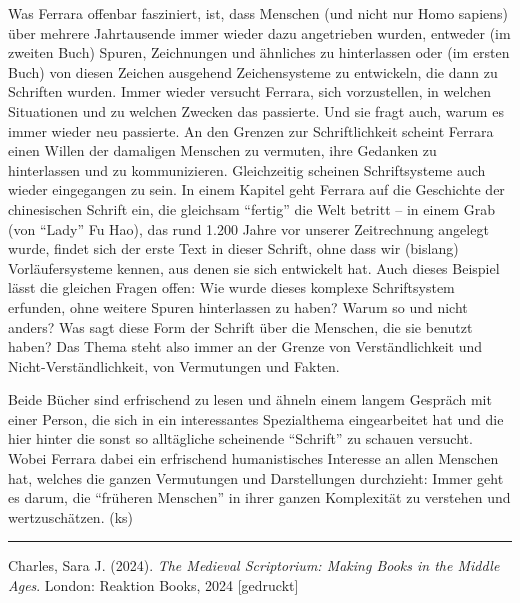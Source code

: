 \documentclass[a4paper,
fontsize=11pt,
oneside,
numbers=noperiodatend,
parskip=half-,
bibliography=totoc,
final
]{scrartcl}
\begin{document}
Was Ferrara offenbar fasziniert, ist, dass Menschen (und nicht nur Homo
sapiens) über mehrere Jahrtausende immer wieder dazu angetrieben wurden,
entweder (im zweiten Buch) Spuren, Zeichnungen und ähnliches zu
hinterlassen oder (im ersten Buch) von diesen Zeichen ausgehend
Zeichensysteme zu entwickeln, die dann zu Schriften wurden. Immer wieder
versucht Ferrara, sich vorzustellen, in welchen Situationen und zu
welchen Zwecken das passierte. Und sie fragt auch, warum es immer wieder
neu passierte. An den Grenzen zur Schriftlichkeit scheint Ferrara einen
Willen der damaligen Menschen zu vermuten, ihre Gedanken zu hinterlassen
und zu kommunizieren. Gleichzeitig scheinen Schriftsysteme auch wieder
eingegangen zu sein. In einem Kapitel geht Ferrara auf die Geschichte
der chinesischen Schrift ein, die gleichsam \enquote{fertig} die Welt betritt --
in einem Grab (von \enquote{Lady} Fu Hao), das rund 1.200 Jahre vor unserer
Zeitrechnung angelegt wurde, findet sich der erste Text in dieser
Schrift, ohne dass wir (bislang) Vorläufersysteme kennen, aus denen sie
sich entwickelt hat. Auch dieses Beispiel lässt die gleichen Fragen
offen: Wie wurde dieses komplexe Schriftsystem erfunden, ohne weitere
Spuren hinterlassen zu haben? Warum so und nicht anders? Was sagt diese
Form der Schrift über die Menschen, die sie benutzt haben? Das Thema
steht also immer an der Grenze von Verständlichkeit und
Nicht-Verständlichkeit, von Vermutungen und Fakten.

Beide Bücher sind erfrischend zu lesen und ähneln einem langem Gespräch
mit einer Person, die sich in ein interessantes Spezialthema
eingearbeitet hat und die hier hinter die sonst so alltägliche
scheinende \enquote{Schrift} zu schauen versucht. Wobei Ferrara dabei ein
erfrischend humanistisches Interesse an allen Menschen hat, welches die
ganzen Vermutungen und Darstellungen durchzieht: Immer geht es darum,
die \enquote{früheren Menschen} in ihrer ganzen Komplexität zu verstehen
und wertzuschätzen. (ks)

\begin{center}\rule{0.5\linewidth}{0.5pt}\end{center}

Charles, Sara J. (2024). \emph{The Medieval Scriptorium: Making Books in
the Middle Ages}. London: Reaktion Books, 2024 {[}gedruckt{]}
\end{document}

